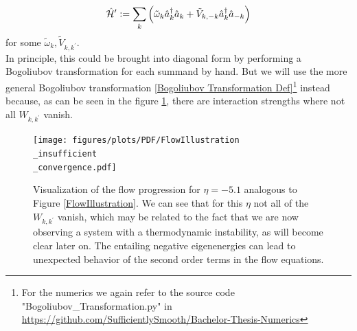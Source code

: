 \begin{equation}
\hat{\mathcal{H}}^\prime \vcentcolon= \sum\limits_{k}\left(\tilde\omega_k \hat a^\dagger_k\hat a_k + \tilde V_{k,-k}\hat a^\dagger_k\hat a_{-k}\right)
\end{equation}
for some $\tilde\omega_k,\tilde V_{k,k^\prime}$.\\
In principle, this could be brought into diagonal form by performing a Bogoliubov transformation for each summand by hand. But we will use the more general Bogoliubov transformation \ref{Bogoliubov Transformation Def}\footnote{For the numerics we again refer to the source code "Bogoliubov\_Transformation.py" in \url{https://github.com/SufficientlySmooth/Bachelor-Thesis-Numerics}} instead because, as can be seen in the figure \ref{FlowIllustrationInsufficient}, there are interaction strengths where not all $W_{k,k^\prime}$ vanish.
\begin{figure}[H]
    \centering
    \texttt{[image: figures/plots/PDF/FlowIllustration\\\_insufficient\\\_convergence.pdf]}
    \caption[Flow Visualization for $\eta=-5.1$]{Visualization of the flow progression for $\eta=-5.1$ analogous to Figure \ref{FlowIllustration}. We can see that for this $\eta$ not all of the $W_{k,k^\prime}$ vanish, which may be related to the fact that we are now observing a system with a thermodynamic instability, as will become clear later on. The entailing negative eigenenergies can lead to unexpected behavior of the second order terms in the flow equations.}
    \label{FlowIllustrationInsufficient}
\end{figure}

